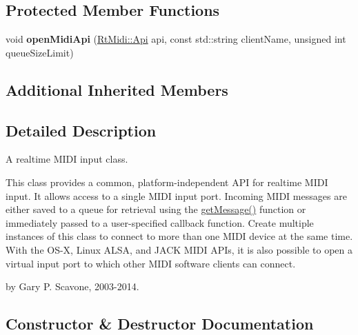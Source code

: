 \subsection*{Protected Member Functions}
\begin{DoxyCompactItemize}
\item 
void {\bfseries open\+Midi\+Api} (\hyperlink{class_rt_midi_aac66af04a85fe5c5f07c360574a19406}{Rt\+Midi\+::\+Api} api, const std\+::string client\+Name, unsigned int queue\+Size\+Limit)\hypertarget{class_rt_midi_in_ae8f10c3a75a0f24b5d9f33fa83545ff5}{}\label{class_rt_midi_in_ae8f10c3a75a0f24b5d9f33fa83545ff5}

\end{DoxyCompactItemize}
\subsection*{Additional Inherited Members}


\subsection{Detailed Description}
A realtime M\+I\+DI input class. 

This class provides a common, platform-\/independent A\+PI for realtime M\+I\+DI input. It allows access to a single M\+I\+DI input port. Incoming M\+I\+DI messages are either saved to a queue for retrieval using the \hyperlink{class_rt_midi_in_a1ba10ecd276b30a8579c7d60a9c890eb}{get\+Message()} function or immediately passed to a user-\/specified callback function. Create multiple instances of this class to connect to more than one M\+I\+DI device at the same time. With the O\+S-\/X, Linux A\+L\+SA, and J\+A\+CK M\+I\+DI A\+P\+Is, it is also possible to open a virtual input port to which other M\+I\+DI software clients can connect.

by Gary P. Scavone, 2003-\/2014. 

\subsection{Constructor \& Destructor Documentation}
